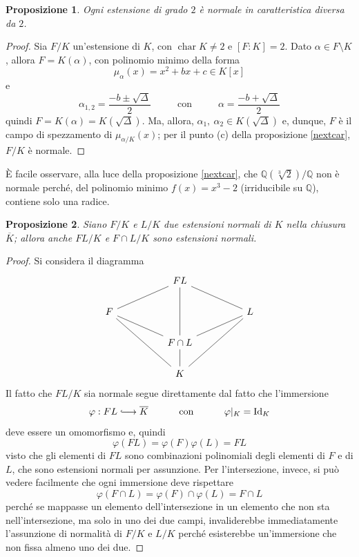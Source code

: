 \documentclass[12pt]{scrartcl}
\theoremstyle{style}
\newtheorem{prop}{Proposizione}[section]
\numberwithin{equation}{subsection}
\newcommand{\longhookrightarrow}{\lhook\joinrel\longrightarrow}
\begin{document}
\begin{prop}
	Ogni estensione di grado $2$ \`e normale in caratteristica diversa da $2$.
\end{prop}
\begin{proof}
	Sia $F/K$ un'estensione di $K$, con $\operatorname{char} K \neq 2$ e $[F:K] = 2$.
	Dato $\alpha  \in F \setminus K$, allora $F = K(\alpha )$, con polinomio minimo della forma
	\[
		\mu _\alpha (x) = x^2 + bx + c \in K[x]
	\] 
	e
	\[
	\alpha _{1,2} = \frac{-b \pm \sqrt{\Delta } }{2} \hspace{1cm} \text{ con } \hspace{1cm} \alpha = \frac{-b + \sqrt{\Delta } }{2}
	\] 
	quindi $F = K(\alpha ) = K(\sqrt{\Delta } )$. 
	Ma, allora, $\alpha _1, \ \alpha _2 \in K(\sqrt{\Delta } )$ e, dunque, $F$ \`e il campo di spezzamento di $\mu _{\alpha  / K} (x)$; per il punto (c) della proposizione \ref{nextcar}, $F / K$ \`e normale.
\end{proof}
\noindent \`E facile osservare, alla luce della proposizione \ref{nextcar}, che $\mathbb{Q}(\sqrt[3]{2} ) / \mathbb{Q}$ non \`e normale perch\'e, del polinomio minimo $f(x) = x^3 - 2$ (irriducibile su $\mathbb{Q}$), contiene solo una radice.
\begin{prop}
	Siano $F / K$ e $L / K$ due estensioni normali di $K$ nella chiusura $\overline{K}$; allora anche $FL / K$ e $F\cap L / K$ sono estensioni normali.
\end{prop}
\begin{proof}
	Si considera il diagramma 
	\[
	\begin{tikzcd}
		& & FL & &\\
		F & & & & L\\
		  & & F\cap L & &\\
		  & & K & &
		  \arrow[from=1-3, to=3-3, no head]
		  \arrow[from=1-3, to=2-1, no head]
		  \arrow[from=1-3, to=2-5, no head]
		  \arrow[from=3-3, to=2-1, no head]
		  \arrow[from=3-3, to=2-5, no head]
		  \arrow[from=3-3, to=4-3, no head]
		  \arrow[from=4-3, to=2-1, no head]
		  \arrow[from=4-3, to=2-5, no head]
	\end{tikzcd}
	\] 
	Il fatto che $FL / K$ sia normale segue direttamente dal fatto che l'immersione 
	\[
	\varphi : FL\longhookrightarrow \overline{K} \hspace{1cm} \text{ con }\hspace{1cm}\varphi |_K = \mathrm{Id} _K
	\] 
	deve essere un omomorfismo e, quindi
	\[
	\varphi (FL) = \varphi (F) \varphi (L) = FL
	\] 
	visto che gli elementi di $FL$ sono combinazioni polinomiali degli elementi di $F$ e di $L$, che sono estensioni normali per assunzione.
	Per l'intersezione, invece, si pu\`o vedere facilmente che ogni immersione deve rispettare
	\[
	\varphi (F\cap L) = \varphi (F) \cap \varphi (L) = F\cap L
	\] 
	perch\'e se mappasse un elemento dell'intersezione in un elemento che non sta nell'intersezione, ma solo in uno dei due campi, invaliderebbe immediatamente l'assunzione di normalit\`a di $F / K$ e $L / K$ perch\'e esisterebbe un'immersione che non fissa almeno uno dei due.
\end{proof}
\end{document}
